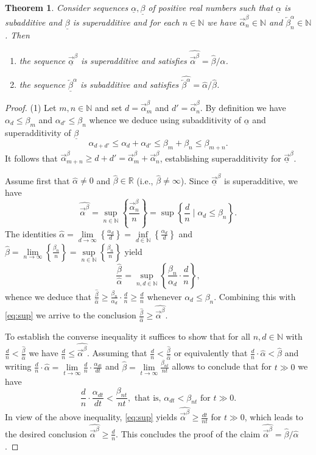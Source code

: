 \documentclass[12pt, reqno]{amsart}
\numberwithin{equation}{section}
\def\a{\ensuremath{\alpha}}
\def\ua{\ensuremath{\underline{\alpha}}}
\def\b{\ensuremath{\beta}}
\def\ub{\ensuremath{\underline{\beta}}}
\newcommand{\wa}{\widehat{\alpha}}
\newcommand{\wb}{\widehat{\beta}}
\newcommand{\N}{{\mathbb N}}
\newcommand{\R}{{\mathbb R}}
\theoremstyle{plain} %
\newtheorem{thm}{Theorem}[section]
\theoremstyle{definition}
\theoremstyle{remark}
\newcommand{\uau}{\overrightarrow{\ua}}
\newcommand{\au}{\overrightarrow{\alpha}}
\newcommand{\ubo}{\overleftarrow{\ub}}
\newcommand{\bo}{\overleftarrow{\beta}}
\begin{document}
 \begin{thm}
\label{thm:relativeduality}
Consider sequences $\ua, \ub$ of positive real numbers such that $\ua$ is subadditive  and $\ub$ is superadditive and for each $n\in\N$ we have $\au^\b_n\in\N$ and $\bo^\a_n\in\N$. Then
\begin{enumerate}
\item  the sequence $\uau^\b$ is superadditive and satisfies $\widehat{\au^\b}=\widehat{\b}/\widehat{\a}$.
\item the sequence $\ubo^\a$ is subadditive and satisfies $\widehat{\bo^\a}=\widehat{\a}/\widehat{\b}$.
\end{enumerate}
\end{thm}
\begin{proof}
(1) Let $m,n\in\N$ and set $d=\au^\b_m$ and $d'=\au^\b_n$. By definition we have $\a_d\leq \b_m$ and $\a_{d'}\leq \b_n$ whence we deduce using subadditivity of $\ua$ and superadditivity of $\ub$
\[
\a_{d+d'}\leq \a_d+\a_{d'}\leq \b_m+\b_n\leq \b_{m+n}.
\]
It follows that $\au^\b_{m+n}\geq d+d'=\au^\b_m+\au^\b_n$, establishing superadditivity for $\uau^\b$.

Assume first that $\wa\neq 0$ and $\wb\in \R$ (i.e., $\wb\neq \infty$). 
Since $\uau^\b$ is superadditive, we have 
\begin{equation}
\label{eq:sup}
\widehat{\au^\b}=\sup_{n\in \N}\left\{ \frac{\au^\b_n}{n} \right\}=\sup \left \{\frac{d}{n} \mid \a_d\leq \b_n \right \}.
\end{equation}
The identities $\wa=\lim\limits_{d\to\infty}\left\{ \frac{\a_d}{d} \right\}=\inf\limits_{d\in\N}\left\{ \frac{\a_d}{d} \right\}$ and $\wb=\lim\limits_{n\to \infty}\left\{ \frac{\b_n}{n} \right\}=\sup\limits_{n\in\N}\left\{ \frac{\b_n}{n} \right\}$ yield 
\[
\frac{\wb}{\wa}=\sup\limits_{n,d\in \N}\left\{ \frac{\b_n}{\a_d}\cdot \frac{d}{n} \right\},
\]
whence we deduce that $\frac{\wb}{\wa}\geq \frac{\b_n}{\a_d}\cdot \frac{d}{n}\geq  \frac{d}{n}$ whenever $\a_d\leq \b_n$.
Combining this with \eqref{eq:sup} we arrive to the conclusion $\frac{\wb}{\wa}\geq \widehat{\au^\b}$.

To establish the converse inequality it suffices to show that for all $n,d\in\N$ with $\frac{d}{n}<\frac{\wb}{\wa}$ we have  $\frac{d}{n}\leq  \widehat{\au^\b}$. Assuming that $\frac{d}{n}<\frac{\wb}{\wa}$ or equivalently that $\frac{d}{n} \cdot \wa<{\wb}$  and writing $\frac{d}{n} \cdot \wa=\lim\limits_{t\to \infty}\frac{d}{n}\cdot\frac{\a_{dt}}{dt}$ and $\wb=\lim\limits_{t\to \infty}\frac{\b_{nt}}{nt}$ allows to conclude that for $t\gg 0$ we have 
\begin{equation}
\label{eq:dtvsnt}
\frac{d}{n}\cdot\frac{\a_{dt}}{dt}<\frac{\b_{nt}}{nt}, \text{ that is, } \a_{dt}<\b_{nt} \text{ for } t\gg0.
\end{equation}
In view of the above inequality, \eqref{eq:sup} yields $\widehat{\au^\b}\geq \frac{dt}{nt}$ for $ t\gg0$, which leads to the desired conclusion  $\widehat{\au^\b}\geq \frac{d}{n}$. This concludes the proof of the claim  $\widehat{\au^\b}=\widehat{\b}/\widehat{\a}$.


\end{proof}
\end{document}
